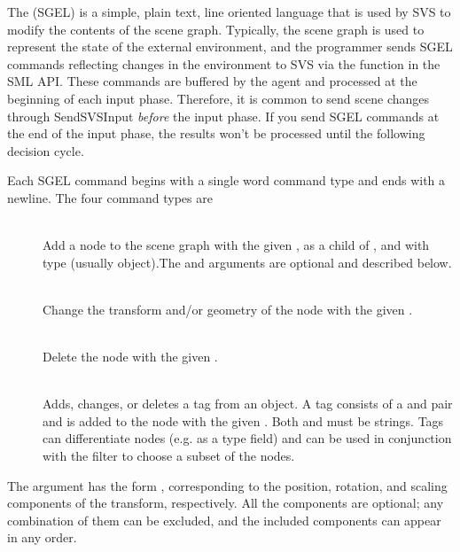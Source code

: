 The  (SGEL) is a simple, plain text, line oriented language that is used by SVS to modify the contents of the scene graph.
Typically, the scene graph is used to represent the state of the external environment, and the programmer sends SGEL commands reflecting changes in the environment to SVS via the  function in the SML API.
These commands are buffered by the agent and processed at the beginning of each input phase.
Therefore, it is common to send scene changes through SendSVSInput \emph{before} the input phase.
If you send SGEL commands at the end of the input phase, 
the results won't be processed until the following decision cycle.

Each SGEL command begins with a single word command type and ends with a newline.
The four command types are

\vspace{-12pt}
\begin{description}
	\item[] \hfill \\
		Add a node to the scene graph with the given , as a child of , and with type  (usually object).The  and  arguments are optional and described below.
	
	\item[] \hfill \\
		Change the transform and/or geometry of the node with the given .
	
	\item[] \hfill \\
		Delete the node with the given .
	
	\item[] \hfill \\
	  Adds, changes, or deletes a tag from an object. A tag consists of a  and  pair and is added to the node with the given . Both  and  must be strings. Tags can differentiate nodes (e.g. as a type field) and can be used in conjunction with the  filter to choose a subset of the nodes. 
\end{description}
\vspace{-6pt}

The  argument has the form \soar{[p X Y Z] [r X Y Z] [s X Y Z]}, corresponding to the position, rotation, and scaling components of the transform, respectively.
All the components are optional; any combination of them can be excluded, and the included components can appear in any order.

